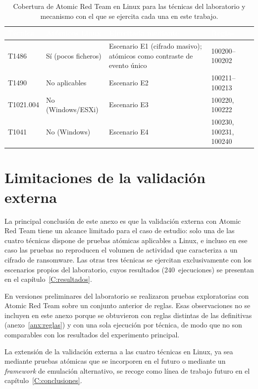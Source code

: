 \documentclass[../main.tex]{subfiles}
\begin{document}
\begin{table}[!h]
  \centering
  \begin{tabularx}{\textwidth}{C{2.2cm} C{3.2cm} X C{2.6cm}}
    \toprule
    \textcolor{white}{\textbf{Técnica}} &
    \textcolor{white}{\textbf{Atómicos Linux}} &
    \textcolor{white}{\textbf{Ejercitada mediante}} &
    \textcolor{white}{\textbf{Reglas}} \\
    \midrule
    T1486     & Sí (pocos ficheros)       & Escenario E1 (cifrado masivo); atómicos como contraste de evento único & 100200--100202 \\
    T1490     & No aplicables             & Escenario E2                     & 100211--100213 \\
    T1021.004 & No (Windows/ESXi)         & Escenario E3                     & 100220, 100222 \\
    T1041     & No (Windows)              & Escenario E4                     & 100230, 100231, 100240 \\
    \bottomrule
  \end{tabularx}
  \caption[Cobertura de Atomic Red Team para las técnicas del laboratorio.]
          {Cobertura de Atomic Red Team en Linux para las técnicas del
           laboratorio y mecanismo con el que se ejercita cada una en este
           trabajo.}
  \label{tab:art}
\end{table}

\section{Limitaciones de la validación externa}
\label{sec:limitaciones-art}

La principal conclusión de este anexo es que la validación externa con Atomic Red
Team tiene un alcance limitado para el caso de estudio: solo una de las cuatro
técnicas dispone de pruebas atómicas aplicables a Linux, e incluso en ese caso las
pruebas no reproducen el volumen de actividad que caracteriza a un cifrado de
ransomware. Las otras tres técnicas se ejercitan exclusivamente con los escenarios
propios del laboratorio, cuyos resultados (240~ejecuciones) se presentan en el
capítulo~\ref{C:resultados}.

En versiones preliminares del laboratorio se realizaron pruebas exploratorias con
Atomic Red Team sobre un conjunto anterior de reglas. Esas observaciones no se
incluyen en este anexo porque se obtuvieron con reglas distintas de las
definitivas (anexo~\ref{anx:reglas}) y con una sola ejecución por técnica, de modo
que no son comparables con los resultados del experimento principal.

La extensión de la validación externa a las cuatro técnicas en Linux, ya sea
mediante pruebas atómicas que se incorporen en el futuro o mediante un
\emph{framework} de emulación alternativo, se recoge como línea de trabajo futuro
en el capítulo~\ref{C:conclusiones}.
\end{document}
